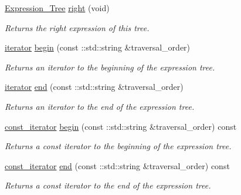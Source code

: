 \begin{DoxyCompactItemize}
\hyperlink{classMadara_1_1Expression__Tree_1_1Expression__Tree}{Expression\_\-Tree} \hyperlink{classMadara_1_1Expression__Tree_1_1Expression__Tree_a817bb84c1447d8cfc70ca84a64fad8fe}{right} (void)
\begin{DoxyCompactList}\small\item\em Returns the right expression of this tree. \item\end{DoxyCompactList}\item 
\hyperlink{classMadara_1_1Expression__Tree_1_1Expression__Tree__Iterator}{iterator} \hyperlink{classMadara_1_1Expression__Tree_1_1Expression__Tree_a87d62db793809ce406d64b531159cd21}{begin} (const ::std::string \&traversal\_\-order)
\begin{DoxyCompactList}\small\item\em Returns an iterator to the beginning of the expression tree. \item\end{DoxyCompactList}\item 
\hyperlink{classMadara_1_1Expression__Tree_1_1Expression__Tree__Iterator}{iterator} \hyperlink{classMadara_1_1Expression__Tree_1_1Expression__Tree_aa25a3fb7d24006c1d8d3a0ab3912c585}{end} (const ::std::string \&traversal\_\-order)
\begin{DoxyCompactList}\small\item\em Returns an iterator to the end of the expression tree. \item\end{DoxyCompactList}\item 
\hyperlink{classMadara_1_1Expression__Tree_1_1Expression__Tree__Const__Iterator}{const\_\-iterator} \hyperlink{classMadara_1_1Expression__Tree_1_1Expression__Tree_acb0c6e46752b71f2a3c9640a993a0b2f}{begin} (const ::std::string \&traversal\_\-order) const 
\begin{DoxyCompactList}\small\item\em Returns a const iterator to the beginning of the expression tree. \item\end{DoxyCompactList}\item 
\hyperlink{classMadara_1_1Expression__Tree_1_1Expression__Tree__Const__Iterator}{const\_\-iterator} \hyperlink{classMadara_1_1Expression__Tree_1_1Expression__Tree_a56d184e7bccff7107df76799123e0df1}{end} (const ::std::string \&traversal\_\-order) const 
\begin{DoxyCompactList}\small\item\em Returns a const iterator to the end of the expression tree. \item\end{DoxyCompactList}\item 

\end{DoxyCompactItemize}
